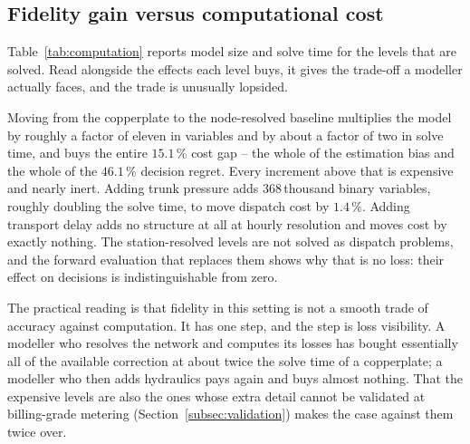 
\subsection{Fidelity gain versus computational cost}
\label{subsec:computation}

Table~\ref{tab:computation} reports model size and solve time for the levels that are
solved. Read alongside the effects each level buys, it gives the trade-off a modeller
actually faces, and the trade is unusually lopsided.

Moving from the copperplate to the node-resolved baseline multiplies the model by roughly
a factor of eleven in variables and by about a factor of two in solve time, and buys the
entire $15.1$\,\% cost gap -- the whole of the estimation bias and the whole of the
$46.1$\,\% decision regret. Every increment above that is expensive and nearly inert.
Adding trunk pressure adds $368$\,thousand binary variables, roughly doubling the solve
time, to move dispatch cost by $1.4$\,\%. Adding transport delay adds no structure at all
at hourly resolution and moves cost by exactly nothing. The station-resolved levels are
not solved as dispatch problems, and the forward evaluation that replaces them shows why
that is no loss: their effect on decisions is indistinguishable from zero.

The practical reading is that fidelity in this setting is not a smooth trade of accuracy
against computation. It has one step, and the step is loss visibility. A modeller who
resolves the network and computes its losses has bought essentially all of the available
correction at about twice the solve time of a copperplate; a modeller who then adds
hydraulics pays again and buys almost nothing. That the expensive levels are also the ones
whose extra detail cannot be validated at billing-grade metering
(Section~\ref{subsec:validation}) makes the case against them twice over.

